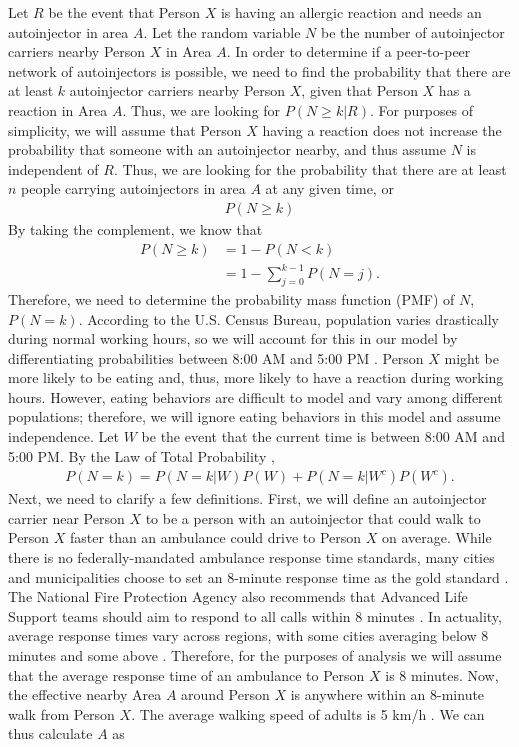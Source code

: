 Let $R$ be the event that Person $X$ is having an allergic reaction and needs an autoinjector in area $A$. Let the random variable $N$ be the number of autoinjector carriers nearby Person $X$ in Area $A$. In order to determine if a peer-to-peer network of autoinjectors is possible, we need to find the probability that there are at least $k$ autoinjector carriers nearby Person $X$, given that Person $X$ has a reaction in Area $A$. Thus, we are looking for $P(N \geq k|R)$. For purposes of simplicity, we will assume that Person $X$ having a reaction does not increase the probability that someone with an autoinjector nearby, and thus assume $N$ is independent of $R$. Thus, we are looking for the probability that there are at least $n$ people carrying autoinjectors in area $A$ at any given time, or
\begin{align*}
    P(N \geq k)
\end{align*}
By taking the complement, we know that
\begin{align*}
    P(N \geq k) &= 1 - P(N < k) \\
    &= 1 - \sum_{j=0}^{k-1}P(N=j).
\end{align*}
Therefore, we need to determine the probability mass function (PMF) of $N$, $P(N=k)$. According to the U.S. Census Bureau, population varies drastically during normal working hours, so we will account for this in our model by differentiating probabilities between 8:00 AM and 5:00 PM \cite{acs}. Person $X$ might be more likely to be eating and, thus, more likely to have a reaction during working hours. However, eating behaviors are difficult to model and vary among different populations; therefore, we will ignore eating behaviors in this model and assume independence. Let $W$ be the event that the current time is between 8:00 AM and 5:00 PM. By the Law of Total Probability \cite{blitz},
\begin{align*}
    P(N=k) = P(N=k|W)P(W)+ P(N=k|W^c)P(W^c).
\end{align*}
Next, we need to clarify a few definitions. First, we will define an autoinjector carrier near Person $X$ to be a person with an autoinjector that could walk to Person $X$ faster than an ambulance could drive to Person $X$ on average. While there is no federally-mandated ambulance response time standards, many cities and municipalities choose to set an 8-minute response time as the gold standard \cite{ems}. The National Fire Protection Agency also recommends that Advanced Life Support teams should aim to respond to all calls within 8 minutes \cite{nfpa}. In actuality, average response times vary across regions, with some cities averaging below 8 minutes and some above \cite{nycems}\cite{bostonems}.  Therefore, for the purposes of analysis we will assume that the average response time of an ambulance to Person $X$ is 8 minutes. Now, the effective nearby Area $A$ around Person $X$ is anywhere within an 8-minute walk from Person $X$. The average walking speed of adults is 5 km/h \cite{walking}. We can thus calculate $A$ as
